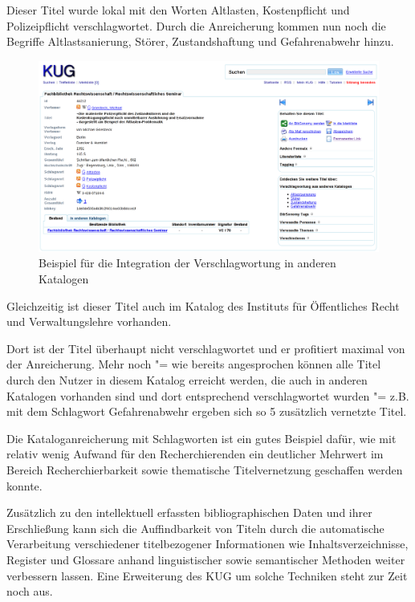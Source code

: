 \documentclass[11pt]{scrartcl}
\begin{document}
Dieser Titel wurde lokal mit den Worten Altlasten, Kostenpflicht und
Polizeipflicht verschlagwortet. Durch die Anreicherung kommen nun noch
die Begriffe Altlastsanierung, Störer, Zustandshaftung und
Gefahrenabwehr hinzu.

\begin{figure}
    \centering \begin{minipage}[b]{1.0\textwidth}
      \centering \includegraphics[width=15cm]{bib20-kug-mashups_bilder/swtenrich1.png}
    \end{minipage}
    \caption{Beispiel für die Integration der Verschlagwortung in anderen Katalogen}
  \label{bild:verschlagwortung}
\end{figure}


Gleichzeitig ist dieser Titel auch im Katalog des Instituts für
Öffentliches Recht und Verwaltungslehre vorhanden.
 
Dort ist der Titel überhaupt nicht verschlagwortet und er profitiert
maximal von der Anreicherung. Mehr noch "= wie bereits angesprochen
können alle Titel durch den Nutzer in diesem Katalog erreicht werden,
die auch in anderen Katalogen vorhanden sind und dort entsprechend
verschlagwortet wurden "= z.B. mit dem Schlagwort Gefahrenabwehr
ergeben sich so 5 zusätzlich vernetzte Titel.

Die Kataloganreicherung mit Schlagworten ist ein gutes Beispiel dafür,
wie mit relativ wenig Aufwand für den Recherchierenden ein deutlicher
Mehrwert im Bereich Recherchierbarkeit sowie thematische
Titelvernetzung geschaffen werden konnte.

Zusätzlich zu den intellektuell erfassten bibliographischen Daten und
ihrer Erschließung kann sich die Auffindbarkeit von Titeln durch die
automatische Verarbeitung verschiedener titelbezogener Informationen
wie Inhaltsverzeichnisse, Register und Glossare anhand linguistischer
sowie semantischer Methoden weiter verbessern lassen. Eine Erweiterung
des KUG um solche Techniken steht zur Zeit noch aus.
\end{document}
